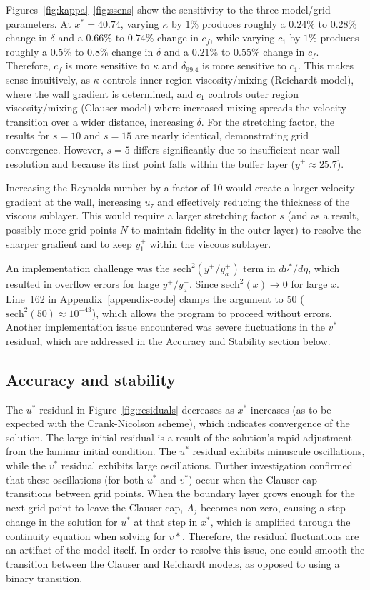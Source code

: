 \documentclass[letterpaper,12pt]{article}
\begin{document}
Figures~\ref{fig:kappa}--\ref{fig:ssens} show the sensitivity to the three model/grid parameters. At $x^* = 40.74$, varying $\kappa$ by $1\%$ produces roughly a $0.24\%$ to $0.28\%$ change in $\delta$ and a $0.66\%$ to $0.74\%$ change in $c_f$, while varying $c_1$ by $1\%$ produces roughly a $0.5\%$ to $0.8\%$ change in $\delta$ and a $0.21\%$ to $0.55\%$ change in $c_f$. Therefore, $c_f$ is more sensitive to $\kappa$ and $\delta_{99.4}$ is more sensitive to $c_1$. This makes sense intuitively, as $\kappa$ controls inner region viscosity/mixing (Reichardt model), where the wall gradient is determined, and $c_1$ controls outer region viscosity/mixing (Clauser model) where increased mixing spreads the velocity transition over a wider distance, increasing $\delta$. For the stretching factor, the results for $s=10$ and $s=15$ are nearly identical, demonstrating grid convergence. However, $s=5$ differs significantly due to insufficient near-wall resolution and because its first point falls within the buffer layer ($y^+ \approx 25.7$).

Increasing the Reynolds number by a factor of 10 would create a larger velocity gradient at the wall, increasing $u_\tau$ and effectively reducing the thickness of the viscous sublayer. This would require a larger stretching factor $s$ (and as a result, possibly more grid points $N$ to maintain fidelity in the outer layer) to resolve the sharper gradient and to keep $y^+_1$ within the viscous sublayer.

An implementation challenge was the $\mathrm{sech}^2(y^+/y_a^+)$ term in $d\nu^*/d\eta$, which resulted in overflow errors for large $y^+/y_a^+$. Since $\mathrm{sech}^2(x) \to 0$ for large $x$. Line~162 in Appendix~\ref{appendix-code} clamps the argument to 50 ($\mathrm{sech}^2(50) \approx 10^{-43}$), which allows the program to proceed without errors. Another implementation issue encountered was severe fluctuations in the $v^*$ residual, which are addressed in the Accuracy and Stability section below.

\subsection{Accuracy and stability}
The $u^*$ residual in Figure~\ref{fig:residuals} decreases as $x^*$ increases (as to be expected with the Crank-Nicolson scheme), which indicates convergence of the solution. The large initial residual is a result of the solution's rapid adjustment from the laminar initial condition. The $u^*$ residual exhibits minuscule oscillations, while the $v^*$ residual exhibits large oscillations. Further investigation confirmed that these oscillations (for both $u^*$ and $v^*$) occur when the Clauser cap transitions between grid points. When the boundary layer grows enough for the next grid point to leave the Clauser cap, $A_j$ becomes non-zero, causing a step change in the solution for $u^*$ at that step in $x^*$, which is amplified through the continuity equation when solving for $v*$. Therefore, the residual fluctuations are an artifact of the model itself. In order to resolve this issue, one could smooth the transition between the Clauser and Reichardt models, as opposed to using a binary transition. 
\end{document}
